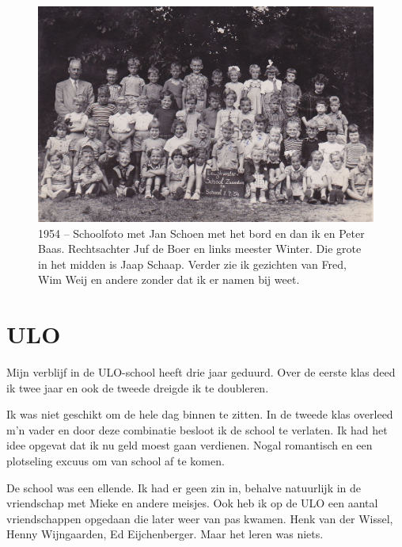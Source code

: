 \documentclass[12pt,twoside, openright]{memoir}
\begin{document}
\begin{figure}
\includegraphics[width=\textwidth]{img/ch18/lwschool}
\caption*{\footnotesize 1954 – Schoolfoto met Jan Schoen met het bord en dan ik en Peter Baas. Rechtsachter Juf de Boer en links meester Winter. Die grote in het midden is Jaap Schaap. Verder zie ik gezichten van Fred, Wim Weij en andere zonder dat ik er namen bij weet.}
\end{figure}


\chapter{ULO} %
\label{cha:ulo}

Mijn verblijf in de ULO-school heeft drie jaar geduurd. Over de eerste klas deed ik twee jaar en ook de tweede dreigde ik te doubleren. 

Ik was niet geschikt om de hele dag binnen te zitten. In de tweede klas overleed m’n vader en door deze combinatie besloot ik de school te verlaten. Ik had het idee opgevat dat ik nu geld moest gaan verdienen. Nogal romantisch en een plotseling excuus om van school af te komen.  

De school was een ellende. Ik had er geen zin in, behalve natuurlijk in de vriendschap met Mieke en andere meisjes. Ook heb ik op de ULO een aantal vriendschappen opgedaan die later weer van pas kwamen. Henk van der Wissel, Henny Wijngaarden, Ed Eijchenberger. Maar het leren was niets. 
\end{document}
